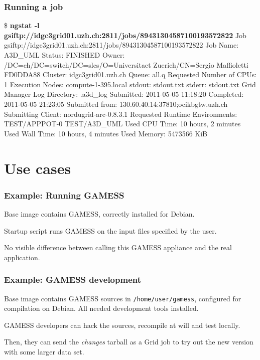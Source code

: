 \documentclass{beamer}
\begin{document}
\begin{frame}[fragile]
  \frametitle{Running a job}
\begin{semiverbatim}\tiny
\$ \textbf{ngstat -l gsiftp://idgc3grid01.uzh.ch:2811/jobs/89431304587100193572822}
Job gsiftp://idgc3grid01.uzh.ch:2811/jobs/89431304587100193572822
  Job Name: A3D\_UML
  Status: FINISHED
  Owner: /DC=ch/DC=switch/DC=slcs/O=Universitaet Zuerich/CN=Sergio Maffioletti FD0DDA88
  Cluster: idgc3grid01.uzh.ch
  Queue: all.q
  Requested Number of CPUs: 1
  Execution Nodes:
    compute-1-395.local
  stdout: stdout.txt
  stderr: stdout.txt
  Grid Manager Log Directory: .a3d\_log
  Submitted: 2011-05-05 11:18:20
  Completed: 2011-05-05 21:23:05
  Submitted from: 130.60.40.14:37810;ocikbgtw.uzh.ch
  Submitting Client: nordugrid-arc-0.8.3.1
  Requested Runtime Environments:
    TEST/APPPOT-0
    TEST/A3D\_UML
  Used CPU Time: 10 hours, 2 minutes
  Used Wall Time: 10 hours, 4 minutes
  Used Memory: 5473566 KiB
\end{semiverbatim}
\end{frame}


\section{Use cases}

\begin{frame}
  \frametitle{Example: Running GAMESS}
  \label{sec:18}
  Base image contains GAMESS, correctly installed for Debian.

  \+
  Startup script runs GAMESS on the input files specified by the user.
  
  \+
  No visible difference between calling this GAMESS appliance and the
  real application.
\end{frame}


\begin{frame}
  \frametitle{Example: GAMESS development}
  \label{sec:19}

  Base image contains GAMESS sources in \texttt{/home/user/gamess},
  configured for compilation on Debian.  All needed development tools
  installed. 
  
  GAMESS developers can hack the sources, recompile at will and test
  locally.
  
  Then, they can send the \emph{changes} tarball as a Grid job to try out the
  new version with some larger data set.
\end{frame}
\end{document}
